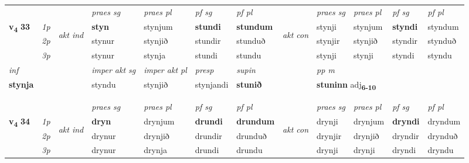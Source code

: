 \begin{longtable}[l]{X>{\footnotesize\itshape}llXXXXlXXXX}
 & &   & \textit{praes sg}  & \textit{praes pl}    & \textit{ pf sg} & \textit{pf pl} & & \textit{praes sg}  & \textit{praes pl}    & \textit{pf sg} & \textit{pf pl }  \\ \cmidrule{4-7} \cmidrule{9-12}
 \multirow{2}{*}{{{\textbf{v{\textsubscript{4}}} \Large{\textbf{33}}}}}  & 1p & \multirow{3}{*}{\begin{turn}{90}\textit{akt ind}\end{turn}} & \textbf{styn} & stynjum & \textbf{stundi} & \textbf{stundum} & \multirow{3}{*}{\begin{turn}{90}\textit{akt con}\end{turn}} &stynji & stynjum & \textbf{styndi} & styndum\\*
 & 2p &  &  stynur  & stynjið & stundir & stunduð & & stynjir & stynjið & styndir & stynduð \\*
 & 3p &  & stynur & stynja & stundi & stundu & & stynji & stynji& styndi & styndu \\*
\cmidrule{4-7} \cmidrule{9-12}

   {\textit{inf}} & &  & \textit{imper akt sg} & \textit{imper akt pl}   & \textit{presp} & \textit{supin}  && \textit{pp m} \\*
  {\textbf{stynja}} & && styndu  & stynjið   & stynjandi &  \textbf{stunið}  && \multicolumn{2}{l}{\textbf{stuninn} adj\textbf{\textsubscript{6-10}}} \\*

\midrule
   & \\*
  & \\
   \midrule
 & &   & \textit{praes sg}  & \textit{praes pl}    & \textit{ pf sg} & \textit{pf pl} & & \textit{praes sg}  & \textit{praes pl}    & \textit{pf sg} & \textit{pf pl }  \\ \cmidrule{4-7} \cmidrule{9-12}
 \multirow{2}{*}{{{\textbf{v{\textsubscript{4}}} \Large{\textbf{34}}}}}  & 1p & \multirow{3}{*}{\begin{turn}{90}\textit{akt ind}\end{turn}} & \textbf{dryn} & drynjum & \textbf{drundi} & \textbf{drundum} & \multirow{3}{*}{\begin{turn}{90}\textit{akt con}\end{turn}} &drynji & drynjum & \textbf{dryndi} & dryndum\\*
 & 2p &  &  drynur  & drynjið & drundir & drunduð & & drynjir & drynjið & dryndir & drynduð \\*
 & 3p &  & drynur & drynja & drundi & drundu & & drynji & drynji& dryndi & dryndu \\*
\cmidrule{4-7} \cmidrule{9-12}


\end{longtable}
